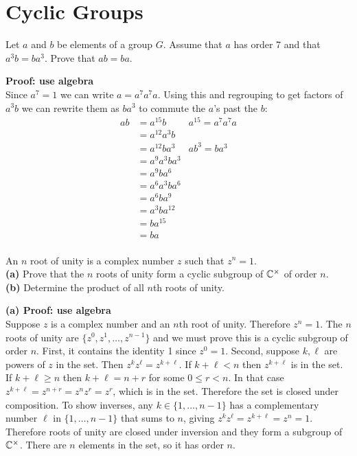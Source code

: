 \documentclass{article}
\begin{document}
\section{Cyclic Groups}
\makeatletter
\setcounter{tcb@cnt@problem}{0}
\makeatother
\begin{problem}
Let $a$ and $b$ be elements of a group $G$. Assume that $a$ has order 7 and that $a^3b = ba^3$. Prove that $ab = ba$.
\end{problem}
\textbf{Proof: use algebra}
\\

Since $a^7 = 1$ we can write $a = a^7a^7a$. Using this and regrouping to get factors of $a^3 b$ we can rewrite them as $ba^3$ to commute the $a$'s past the $b$:
\begin{align*}
    ab & = a^{15}b        & a^{15} = a^7 a^7 a \\
       & = a^{12}a^{3}b   &                    \\
       & = a^{12}ba^{3}   & ab^3 = ba^3        \\
       & = a^{9}a^{3}ba^3 &                    \\
       & = a^{9}ba^{6}    &                    \\
       & = a^6 a^3 b a^6  &                    \\
       & = a^6 ba^9       &                    \\
       & = a^3 ba^{12}    &                    \\
       & = ba^{15}        &                    \\
       & = ba             &                    \\
\end{align*}

\begin{problem}
An $n$ root of unity is a complex number $z$ such that $z^n = 1$.
\\
\textbf{(a)} Prove that the $n$ roots of unity form a cyclic subgroup of $\mathbb{C}^\times$ of order $n$.
\\
\textbf{(b)} Determine the product of all $n$th roots of unity.
\end{problem}
\textbf{(a) Proof: use algebra}
\\

Suppose $z$ is a complex number and an $n$th root of unity. Therefore $z^n = 1$. The $n$ roots of unity are $\{z^0, z^1, \ldots, z^{n-1}\}$ and we must prove this is a cyclic subgroup of order $n$. First, it contains the identity 1 since $z^0 = 1$. Second, suppose $k, \ell$ are powers of $z$ in the set. Then $z^k z^\ell = z^{k + \ell}$. If $k + \ell < n$ then $z^{k + \ell}$ is in the set. If $k + \ell \geq n$ then $k + \ell = n + r$ for some $0 \leq r < n$. In that case $z^{k + \ell} = z^{n+r}=z^n z^r = z^r$, which is in the set. Therefore the set is closed under composition. To show inverses, any $k \in \{1, \ldots, n-1\}$ has a complementary number $\ell$ in $\{1, \ldots, n-1\}$ that sums to $n$, giving $z^k z^\ell = z^{k + \ell} = z^n = 1$. Therefore roots of unity are closed under inversion and they form a subgroup of $\mathbb{C}^\times$. There are $n$ elements in the set, so it has order $n$.
\\
\end{document}
